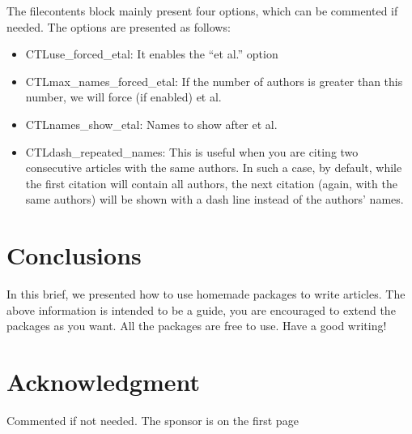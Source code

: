 \documentclass[conference]{IEEEtran}
\begin{document}
The filecontents block mainly present four options, which can be commented if needed.
The options are presented as follows:
\begin{itemize}
    \item CTLuse\_forced\_etal: It enables the ``et al.'' option 
    \item CTLmax\_names\_forced\_etal: If the number of authors is greater than this number, we will force (if enabled) et al.
    \item CTLnames\_show\_etal: Names to show after et al.
    \item CTLdash\_repeated\_names: This is useful when you are citing two consecutive articles with the same authors.
    In such a case, by default, while the first citation will contain all authors, the next citation (again, with the same authors) will be shown with a dash line instead of the authors' names.
\end{itemize}




\IEEEpubidadjcol


\section{Conclusions}\label{sec:conclusions}
In this brief, we presented how to use homemade packages to write articles.
The above information is intended to be a guide, you are encouraged to extend the packages as you want.
All the packages are free to use.
Have a good writing! 


\section*{Acknowledgment}
Commented if not needed. The sponsor is on the first page




\end{document}
